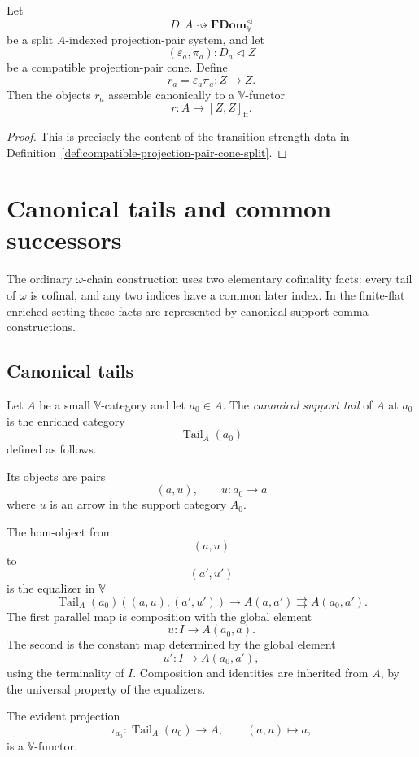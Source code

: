 \begin{lemma}
\label{lem:approximants-are-functorial}
Let
\[
    D:A\rightsquigarrow\mathbf{FDom}_{\mathbb V}^{\triangleleft}
\]
be a split \(A\)-indexed projection-pair system, and let
\[
    (\varepsilon_a,\pi_a):D_a\triangleleft Z
\]
be a compatible projection-pair cone.  Define
\[
    r_a=\varepsilon_a\pi_a:Z\to Z.
\]
Then the objects \(r_a\) assemble canonically to a \(\mathbb V\)-functor
\[
    r:A\to[Z,Z]_{\mathrm{ff}}.
\]
\end{lemma}

\begin{proof}
This is precisely the content of the transition-strength data in
Definition~\ref{def:compatible-projection-pair-cone-split}.
\end{proof}

\section{Canonical tails and common successors}
\label{sec:canonical-tails-common-successors}

The ordinary \(\omega\)-chain construction uses two elementary cofinality
facts: every tail of \(\omega\) is cofinal, and any two indices have a common
later index.  In the finite-flat enriched setting these facts are represented
by canonical support-comma constructions.

\subsection{Canonical tails}

\begin{definition}
\label{def:canonical-support-tail}
Let \(A\) be a small \(\mathbb V\)-category and let \(a_0\in A\).  The
\emph{canonical support tail} of \(A\) at \(a_0\) is the enriched category
\[
    \operatorname{Tail}_A(a_0)
\]
defined as follows.

Its objects are pairs
\[
    (a,u),
    \qquad
    u:a_0\to a
\]
where \(u\) is an arrow in the support category \(A_0\).

The hom-object from
\[
    (a,u)
\]
to
\[
    (a',u')
\]
is the equalizer in \(\mathbb V\)
\[
    \operatorname{Tail}_A(a_0)((a,u),(a',u'))
    \longrightarrow
    A(a,a')
    \rightrightarrows
    A(a_0,a').
\]
The first parallel map is composition with the global element
\[
    u:I\to A(a_0,a).
\]
The second is the constant map determined by the global element
\[
    u':I\to A(a_0,a'),
\]
using the terminality of \(I\).  Composition and identities are inherited from
\(A\), by the universal property of the equalizers.

The evident projection
\[
    \tau_{a_0}:\operatorname{Tail}_A(a_0)\to A,
    \qquad
    (a,u)\longmapsto a,
\]
is a \(\mathbb V\)-functor.
\end{definition}

